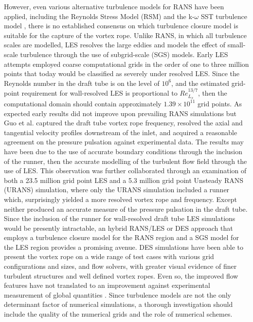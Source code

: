 However, even various alternative turbulence models for RANS have been applied, including the Reynolds Stress Model (RSM) \cite{sick2002cfd, stein2006numerical, jovst2009numerical, jovst2011numerical} and the k-$\omega$ SST turbulence model \cite{foroutan2012simulation, foroutan2014flow, krappel2014investigation}, there is no established consensus on which turbulence closure model is suitable for the capture of the vortex rope. Unlike RANS, in which all turbulence scales are modelled, LES resolves the large eddies and models the effect of small-scale turbulence through the use of subgrid-scale (SGS) models. Early LES attempts \cite{chen1995multi,skotak2000helical,guo2006large} employed coarse computational grids in the order of one to three million points that today would be classified as severely under resolved LES. Since the Reynolds number in the draft tube is on the level of $10^{6}$, and the estimated grid-point requirement for wall-resolved LES is proportional to $Re_{L_{x}}^{13/7}$, then the computational domain should contain approximately $1.39\times 10^{11}$ grid points. As expected early results \cite{chen1995multi,skotak2000helical} did not improve upon prevailing RANS simulations but Guo et al. \cite{guo2006large} captured the draft tube vortex rope frequency, resolved the axial and tangential velocity profiles downstream of the inlet, and acquired a reasonable agreement on the pressure pulsation against experimental data. The results may have been due to the use of accurate boundary conditions through the inclusion of the runner, then the accurate modelling of the turbulent flow field through the use of LES. This observation was further collaborated through an examination \cite{jovst2011numerical} of both a 23.5 million grid point LES and a 5.3 million grid point Unsteady RANS (URANS) simulation, where only the URANS simulation included a runner which, surprisingly yielded a more resolved vortex rope and frequency. Except neither produced an accurate measure of the pressure pulsation in the draft tube. Since the inclusion of the runner for wall-resolved draft tube LES simulations would be presently intractable, an hybrid RANS/LES or DES approach that employs a turbulence closure model for the RANS region and a SGS model for the LES region provides a promising avenue. DES simulations \cite{jovst2011numerical, krappel2014investigation} have been able to present the vortex rope on a wide range of test cases with various grid configurations and sizes, and flow solvers, with greater visual evidence of finer turbulent structures and well defined vortex ropes. Even so, the improved flow features have not translated to an improvement against experimental measurement of global quantities \cite{jovst2011numerical}.
Since turbulence models are not the only determinant factor of numerical simulations, a thorough investigation should include the quality of the numerical grids and the role of numerical schemes.

